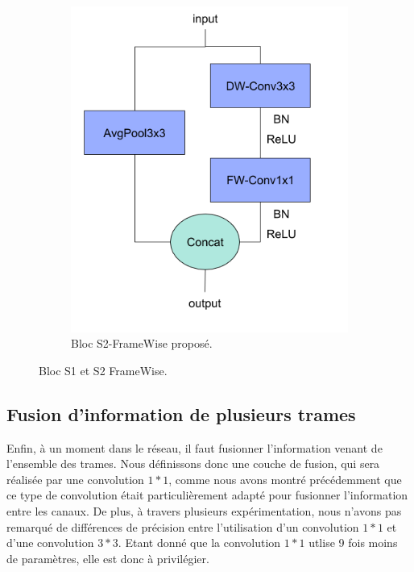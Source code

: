 \begin{figure}[!htb]
\begin{subfigure}{0.48\textwidth}
\includegraphics[width=\textwidth]{figures/stride2-FW.png}%
\caption{Bloc S2-FrameWise proposé.}%
\label{fig:FWS2}%

\end{subfigure}

\caption{Bloc S1 et S2 FrameWise.}
\label{fig:framewiseS1S2}
\end{figure}



\subsection{Fusion d'information de plusieurs trames}
\label{sec:fusion}

Enfin, à un moment dans le réseau, il faut fusionner l'information venant de l'ensemble des trames.
Nous définissons donc une couche de fusion, qui sera réalisée par une convolution $1*1$, comme nous avons montré précédemment que ce type de convolution était particulièrement adapté pour fusionner l'information entre les canaux.
De plus, à travers plusieurs expérimentation, nous n'avons pas remarqué de différences de précision entre l'utilisation d'un convolution $1*1$ et d'une convolution $3*3$. 
Etant donné que la convolution $1*1$ utlise 9 fois moins de paramètres, elle est donc à privilégier.

